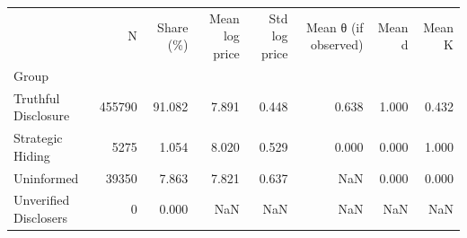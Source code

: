 \begin{tabular}{lrrrrrrr}
\toprule
 & N & Share (\%) & Mean log price & Std log price & Mean θ (if observed) & Mean d & Mean K \\
Group &  &  &  &  &  &  &  \\
\midrule
Truthful Disclosure & 455790 & 91.082 & 7.891 & 0.448 & 0.638 & 1.000 & 0.432 \\
Strategic Hiding & 5275 & 1.054 & 8.020 & 0.529 & 0.000 & 0.000 & 1.000 \\
Uninformed & 39350 & 7.863 & 7.821 & 0.637 & NaN & 0.000 & 0.000 \\
Unverified Disclosers & 0 & 0.000 & NaN & NaN & NaN & NaN & NaN \\
\bottomrule
\end{tabular}
